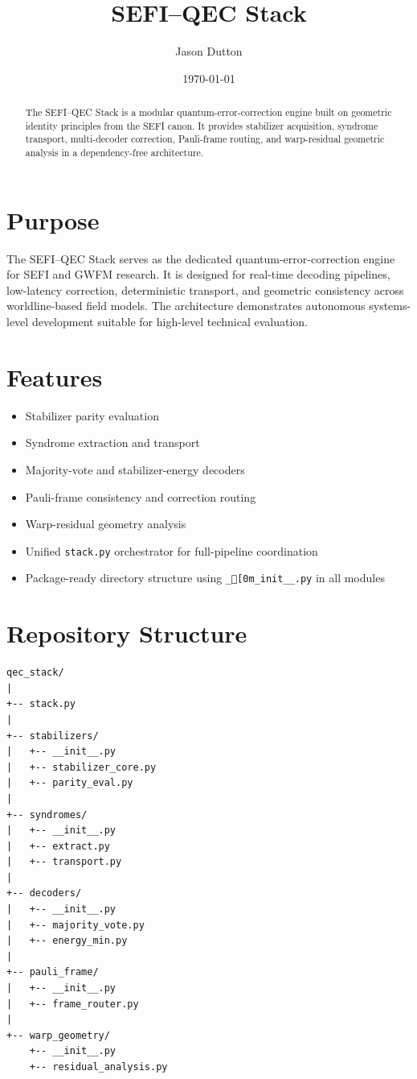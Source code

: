 \documentclass[11pt]{article}
\title{SEFI--QEC Stack}
\author{Jason Dutton}
\date{\today}
\begin{document}
\maketitle

\begin{abstract}
The SEFI--QEC Stack is a modular quantum-error-correction engine built on geometric identity principles from the SEFI canon. It provides stabilizer acquisition, syndrome transport, multi-decoder correction, Pauli-frame routing, and warp-residual geometric analysis in a dependency-free architecture.
\end{abstract}

\section{Purpose}

The SEFI--QEC Stack serves as the dedicated quantum-error-correction engine for SEFI and GWFM research. It is designed for real-time decoding pipelines, low-latency correction, deterministic transport, and geometric consistency across worldline-based field models. The architecture demonstrates autonomous systems-level development suitable for high-level technical evaluation.

\section{Features}

\begin{itemize}[leftmargin=*]
  \item Stabilizer parity evaluation
  \item Syndrome extraction and transport
  \item Majority-vote and stabilizer-energy decoders
  \item Pauli-frame consistency and correction routing
  \item Warp-residual geometry analysis
  \item Unified \texttt{stack.py} orchestrator for full-pipeline coordination
  \item Package-ready directory structure using \texttt{\_[0m\_init\_\_.py} in all modules
\end{itemize}

\section{Repository Structure}

\begin{lstlisting}
qec_stack/
|
+-- stack.py
|
+-- stabilizers/
|   +-- __init__.py
|   +-- stabilizer_core.py
|   +-- parity_eval.py
|
+-- syndromes/
|   +-- __init__.py
|   +-- extract.py
|   +-- transport.py
|
+-- decoders/
|   +-- __init__.py
|   +-- majority_vote.py
|   +-- energy_min.py
|
+-- pauli_frame/
|   +-- __init__.py
|   +-- frame_router.py
|
+-- warp_geometry/
    +-- __init__.py
    +-- residual_analysis.py
\end{lstlisting}
\end{document}
